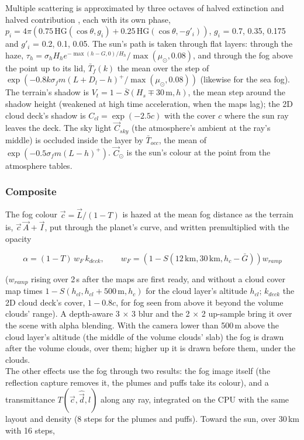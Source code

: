 \documentclass[Orbiter Technical Reference.tex]{subfiles}
\begin{document}
\begin{sloppypar}
\noindent
Multiple scattering is approximated by three octaves of halved extinction and halved contribution \cite{wrenninge2013}, each with its own phase, $p_{i} = 4\pi\left(0.75\,\mathrm{HG}(\cos\theta, g_{i}) + 0.25\,\mathrm{HG}(\cos\theta, -g'_{i})\right)$, $g_{i}$ = 0.7, 0.35, 0.175 and $g'_{i}$ = 0.2, 0.1, 0.05. The sun's path is taken through flat layers: through the haze, $\tau_{h} = \sigma_{h}H_{h}e^{-\max(h - G, 0)/H_{h}}/\max(\mu_{\odot}, 0.08)$, and through the fog above the point up to its lid, $\bar{T}_{f}(k)$ the mean over the step of $\exp(-0.8k\sigma_{f}m(L + D_{l} - h)^{+}/\max(\mu_{\odot}, 0.08))$ (likewise for the sea fog). The terrain's shadow is $V_{t} = 1 - \overline{S}(H_{s} \mp 30\,\mathrm{m}, h)$, the mean step around the shadow height (weakened at high time acceleration, when the maps lag); the 2D cloud deck's shadow is $C_{cl} = \exp(-2.5c)$ with the cover $c$ where the sun ray leaves the deck. The sky light $\vec{C}_{sky}$ (the atmosphere's ambient at the ray's middle) is occluded inside the layer by $\bar{T}_{occ}$, the mean of $\exp(-0.5\sigma_{f}m(L - h)^{+})$. $\vec{C}_{\odot}$ is the sun's colour at the point from the atmosphere tables.

\subsubsection{Composite}
The fog colour $\vec{c} = \vec{L}/(1 - T)$ is hazed at the mean fog distance as the terrain is, $\vec{c}\,\vec{A} + \vec{I}$, put through the planet's curve, and written premultiplied with the opacity

\[ \alpha = (1 - T)\,w_{F}\,k_{deck}, \qquad w_{F} = \left(1 - S(12\,\mathrm{km}, 30\,\mathrm{km}, h_{c} - \bar{G})\right) w_{ramp} \]

\noindent
($w_{ramp}$ rising over 2\,s after the maps are first ready, and without a cloud cover map times $1 - S(h_{cl}, h_{cl} + 500\,\mathrm{m}, h_{c})$ for the cloud layer's altitude $h_{cl}$; $k_{deck}$ the 2D cloud deck's cover, $1 - 0.8c$, for fog seen from above it beyond the volume clouds' range). A depth-aware 3 $\times$ 3 blur and the 2 $\times$ 2 up-sample bring it over the scene with alpha blending. With the camera lower than 500\,m above the cloud layer's altitude (the middle of the volume clouds' slab) the fog is drawn after the volume clouds, over them; higher up it is drawn before them, under the clouds.\\
The other effects use the fog through two results: the fog image itself (the reflection capture removes it, the plumes and puffs take its colour), and a transmittance $T(\vec{c}, \hat{\vec{d}}, l)$ along any ray, integrated on the CPU with the same layout and density (8 steps for the plumes and puffs). Toward the sun, over 30\,km with 16 steps,


\end{sloppypar}
\end{document}
